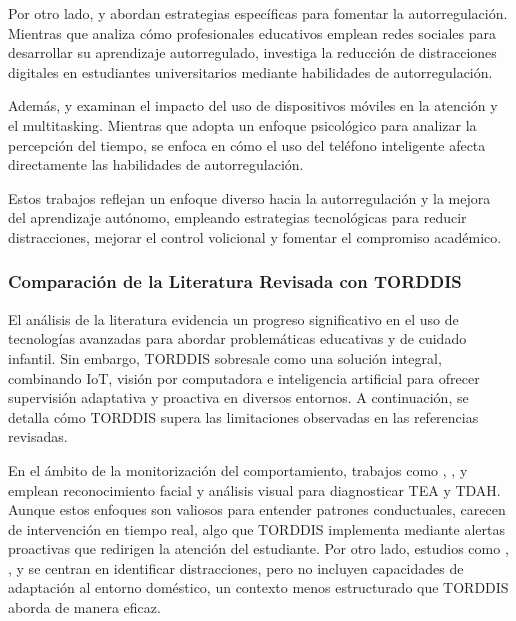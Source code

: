 \documentclass[a4paper,fleqn]{cas-sc}
\begin{document}
				Por otro lado, \cite{Muljana2022Instructional} y \cite{Wang2022Empowering} abordan estrategias específicas para fomentar la autorregulación. Mientras que \cite{Muljana2022Instructional} analiza cómo profesionales educativos emplean redes sociales para desarrollar su aprendizaje autorregulado, \cite{Wang2022Empowering} investiga la reducción de distracciones digitales en estudiantes universitarios mediante habilidades de autorregulación.
				
				Además, \cite{Hartley2022Smartphone} y \cite{Labar2019Interplay} examinan el impacto del uso de dispositivos móviles en la atención y el multitasking. Mientras que \cite{Labar2019Interplay} adopta un enfoque psicológico para analizar la percepción del tiempo, \cite{Hartley2022Smartphone} se enfoca en cómo el uso del teléfono inteligente afecta directamente las habilidades de autorregulación.
				
				Estos trabajos reflejan un enfoque diverso hacia la autorregulación y la mejora del aprendizaje autónomo, empleando estrategias tecnológicas para reducir distracciones, mejorar el control volicional y fomentar el compromiso académico.
				
			\subsubsection{Comparación de la Literatura Revisada con TORDDIS}
				El análisis de la literatura evidencia un progreso significativo en el uso de tecnologías avanzadas para abordar problemáticas educativas y de cuidado infantil. Sin embargo, TORDDIS sobresale como una solución integral, combinando IoT, visión por computadora e inteligencia artificial para ofrecer supervisión adaptativa y proactiva en diversos entornos. A continuación, se detalla cómo TORDDIS supera las limitaciones observadas en las referencias revisadas.
				
				En el ámbito de la monitorización del comportamiento, trabajos como \cite{Akter2021}, \cite{Pelc2006}, y \cite{Albrecht2014} emplean reconocimiento facial y análisis visual para diagnosticar TEA y TDAH. Aunque estos enfoques son valiosos para entender patrones conductuales, carecen de intervención en tiempo real, algo que TORDDIS implementa mediante alertas proactivas que redirigen la atención del estudiante. Por otro lado, estudios como \cite{Campbell2015Using}, \cite{Ucar2022Recognizing}, y \cite{Argel2023Intellitell} se centran en identificar distracciones, pero no incluyen capacidades de adaptación al entorno doméstico, un contexto menos estructurado que TORDDIS aborda de manera eficaz.
				
\end{document}
